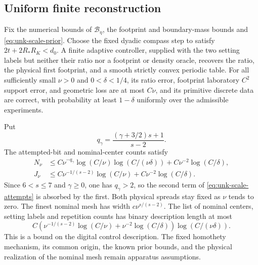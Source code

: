 \subsection{Uniform finite reconstruction}
\begin{theorem}
\label{thm:unk-scale-finite}
Fix the numerical bounds of $\mathcal B_\eta$, the footprint and
boundary-mass bounds and \eqref{eq:unk-scale-prior}. Choose the fixed
dyadic compass step to satisfy $2t+2R_*R_K<d_0$. A finite adaptive
controller, supplied with the
two setting labels but neither their ratio nor a footprint or density
oracle, recovers the ratio, the physical first footprint, and a
smooth strictly convex periodic table. For all sufficiently small
$\nu>0$ and $0<\delta<1/4$, its ratio error, footprint laboratory
$C^2$ support error, and geometric loss are at most $C\nu$, and its
primitive discrete data are correct, with probability at least
$1-\delta$ uniformly over the admissible experiments.

Put
\[
                    q_\gamma=
                    \frac{(\gamma+3/2)s+1}{s-2}.
\]
The attempted-bit and nominal-center counts satisfy
\begin{align}
 N_\nu&\le
 C\nu^{-q_\gamma}\log(C/\nu)\log(C/(\nu\delta))
       +C\nu^{-2}\log(C/\delta),\label{eq:unk-scale-attempts}\\
 J_\nu&\le
 C\nu^{-1/(s-2)}\log(C/\nu)
       +C\nu^{-2}\log(C/\delta).\label{eq:unk-scale-centers}
\end{align}
Since $6<s\le7$ and $\gamma\ge0$, one has $q_\gamma>2$, so the
second term of \eqref{eq:unk-scale-attempts} is absorbed by the first.
Both physical spreads stay fixed as $\nu$ tends to zero. The finest
nominal mesh has width $c\nu^{s/(s-2)}$. The list of nominal centers,
setting labels and repetition counts has binary description length
at most
\begin{equation}\label{eq:unk-scale-control-description}
 C\left(\nu^{-1/(s-2)}\log(C/\nu)
              +\nu^{-2}\log(C/\delta)\right)
                         \log(C/(\nu\delta)).
\end{equation}
This is a bound on the digital control description. The fixed
homothety mechanism, its common origin, the known prior bounds,
and the physical realization of the nominal mesh remain apparatus
assumptions.
\end{theorem}
